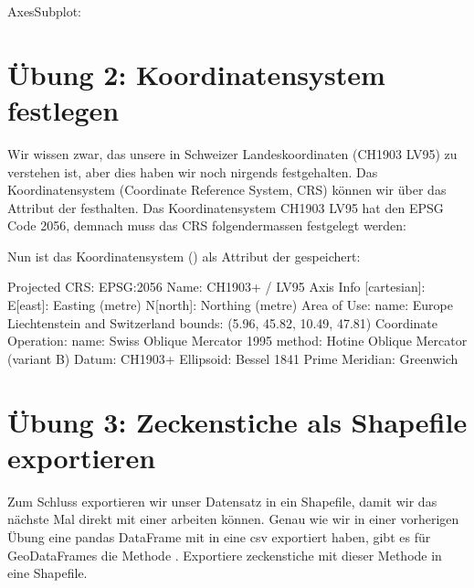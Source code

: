 \documentclass[letterpaper,10pt,english]{sphinxmanual}
\begin{document}
\begin{sphinxVerbatim}[commandchars=\\\{\}]
\PYGZlt{}AxesSubplot:\PYGZgt{}
\end{sphinxVerbatim}


\section{Übung 2: Koordinatensystem festlegen}
\label{\detokenize{01_05_GIS_in_Python:ubung-2-koordinatensystem-festlegen}}
Wir wissen zwar, das unsere  in Schweizer Landeskoordinaten (CH1903 LV95) zu verstehen ist, aber dies haben wir noch nirgends festgehalten. Das Koordinatensystem (Coordinate Reference System, CRS) können wir über das Attribut  der  festhalten. Das Koordinatensystem CH1903 LV95 hat den EPSG Code 2056, demnach muss das CRS folgendermassen festgelegt werden:

\begin{sphinxVerbatim}[commandchars=\\\{\}]
    
\end{sphinxVerbatim}

Nun ist das Koordinatensystem () als Attribut der  gespeichert:

\begin{sphinxVerbatim}[commandchars=\\\{\}]
\end{sphinxVerbatim}

\begin{sphinxVerbatim}[commandchars=\\\{\}]
\PYGZlt{}Projected CRS: EPSG:2056\PYGZgt{}
Name: CH1903+ / LV95
Axis Info [cartesian]:
\PYGZhy{} E[east]: Easting (metre)
\PYGZhy{} N[north]: Northing (metre)
Area of Use:
\PYGZhy{} name: Europe \PYGZhy{} Liechtenstein and Switzerland
\PYGZhy{} bounds: (5.96, 45.82, 10.49, 47.81)
Coordinate Operation:
\PYGZhy{} name: Swiss Oblique Mercator 1995
\PYGZhy{} method: Hotine Oblique Mercator (variant B)
Datum: CH1903+
\PYGZhy{} Ellipsoid: Bessel 1841
\PYGZhy{} Prime Meridian: Greenwich
\end{sphinxVerbatim}


\section{Übung 3: Zeckenstiche als Shapefile exportieren}
\label{\detokenize{01_05_GIS_in_Python:ubung-3-zeckenstiche-als-shapefile-exportieren}}
Zum Schluss exportieren wir unser Datensatz in ein Shapefile, damit wir das nächste Mal direkt mit einer  arbeiten können. Genau wie wir in einer vorherigen Übung eine pandas DataFrame mit  in eine csv exportiert haben, gibt es für GeoDataFrames die Methode . Exportiere zeckenstiche mit dieser Methode in eine Shapefile.
\end{document}
